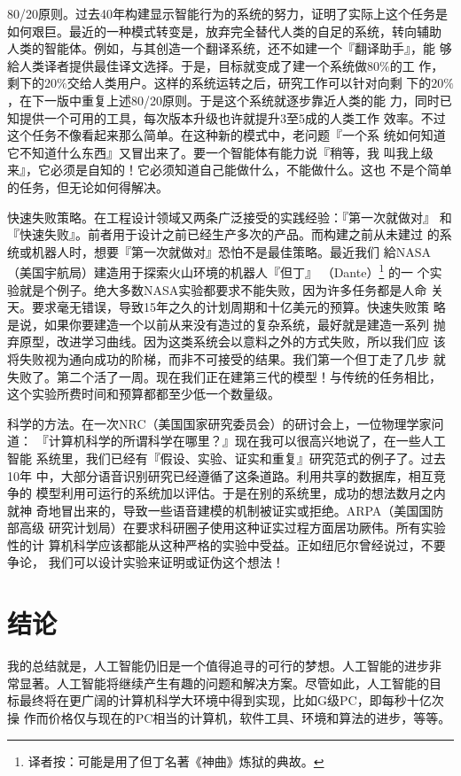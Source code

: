\documentclass[12pt,a4paper]{article}
\begin{document}
80/20原则。过去40年构建显示智能行为的系统的努力，证明了实际上这个任务是
如何艰巨。最近的一种模式转变是，放弃完全替代人类的自足的系统，转向辅助
人类的智能体。例如，与其创造一个翻译系统，还不如建一个『翻译助手』，能
够給人类译者提供最佳译文选择。于是，目标就变成了建一个系统做$80\%$的工
作，剩下的$20\%$交给人类用户。这样的系统运转之后，研究工作可以针对向剩
下的$20\%$，在下一版中重复上述80/20原则。于是这个系统就逐步靠近人类的能
力，同时已知提供一个可用的工具，每次版本升级也许就提升3至5成的人类工作
效率。不过这个任务不像看起来那么简单。在这种新的模式中，老问题『一个系
统如何知道它不知道什么东西』又冒出来了。要一个智能体有能力说『稍等，我
叫我上级来』，它必须是自知的！它必须知道自己能做什么，不能做什么。这也
不是个简单的任务，但无论如何得解决。

快速失败策略。在工程设计领域又两条广泛接受的实践经验：『第一次就做对』
和『快速失败』。前者用于设计之前已经生产多次的产品。而构建之前从未建过
的系统或机器人时，想要『第一次就做对』恐怕不是最佳策略。最近我们
給NASA（美国宇航局）建造用于探索火山环境的机器人『但丁』
（Dante）\footnote{译者按：可能是用了但丁名著《神曲》炼狱的典故。} 的一
个实验就是个例子。绝大多数NASA实验都要求不能失败，因为许多任务都是人命
关天。要求毫无错误，导致15年之久的计划周期和十亿美元的预算。快速失败策
略是说，如果你要建造一个以前从来没有造过的复杂系统，最好就是建造一系列
抛弃原型，改进学习曲线。因为这类系统会以意料之外的方式失败，所以我们应
该将失败视为通向成功的阶梯，而非不可接受的结果。我们第一个但丁走了几步
就失败了。第二个活了一周。现在我们正在建第三代的模型！与传统的任务相比，
这个实验所费时间和预算都都至少低一个数量级。

科学的方法。在一次NRC（美国国家研究委员会）的研讨会上，一位物理学家问道：
『计算机科学的所谓科学在哪里？』现在我可以很高兴地说了，在一些人工智能
系统里，我们已经有『假设、实验、证实和重复』研究范式的例子了。过去10年
中，大部分语音识别研究已经遵循了这条道路。利用共享的数据库，相互竞争的
模型利用可运行的系统加以评估。于是在别的系统里，成功的想法数月之内就神
奇地冒出来的，导致一些语音建模的机制被证实或拒绝。ARPA（美国国防部高级
研究计划局）在要求科研圈子使用这种证实过程方面居功厥伟。所有实验性的计
算机科学应该都能从这种严格的实验中受益。正如纽厄尔曾经说过，不要争论，
我们可以设计实验来证明或证伪这个想法！

\section{结论}

我的总结就是，人工智能仍旧是一个值得追寻的可行的梦想。人工智能的进步非
常显著。人工智能将继续产生有趣的问题和解决方案。尽管如此，人工智能的目
标最终将在更广阔的计算机科学大环境中得到实现，比如G级PC，即每秒十亿次操
作而价格仅与现在的PC相当的计算机，软件工具、环境和算法的进步，等等。
\end{document}
